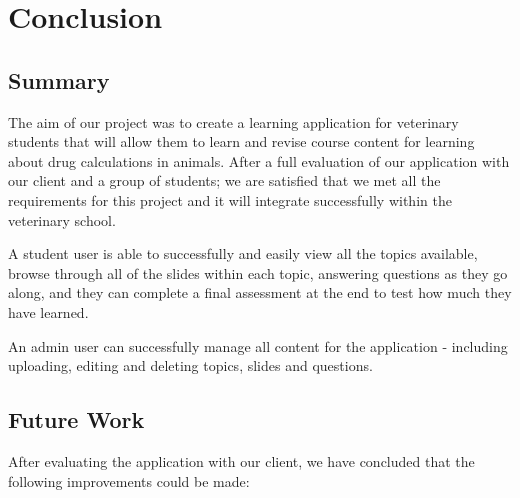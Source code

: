 \documentclass{l3proj}
\begin{document}
{\chapter{Conclusion}
\label{conclusion}

\section{Summary}

The aim of our project was to create a learning application for
veterinary students that will allow them to learn and revise course
content for learning about drug calculations in animals. After a full
evaluation of our application with our client and a group of students;
we are satisfied that we met all the requirements for this project and
it will integrate successfully within the veterinary school.

A student user is able to successfully and easily view all the topics available, browse through all of the slides within each topic, answering questions as they go along, and they can complete a final assessment at the end to test how much they have learned.

An admin user can successfully manage all content for the application
- including uploading, editing and deleting topics, slides and questions. 

\section{Future Work}


After evaluating the application with our client, we have concluded that the following improvements could be made:

}
\end{document}
